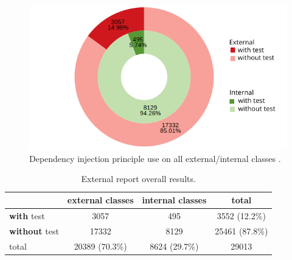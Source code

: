 \documentclass[11pt, a4paper, twocolumn]{article}
\begin{document}
\begin{figure}
    \centering
    \includegraphics[scale = 0.6]{overall_plot.png}
    \caption{\textsf{Dependency injection principle use on all external/internal classes .}}
    \label{fig:dip_withtest_overall}
\end{figure}

\begin{table}[] \centering
\begin{tabular}{|l|c|c|c|}
\hline
\multicolumn{1}{|c|}{} & \textbf{external} classes & \textbf{internal} classes & total \\ \hline
\textbf{with} test 		& 3057     			& 495      			& 3552 (12.2\%)  \\ \hline
\textbf{without} test	& 17332    			& 8129     			& 25461 (87.8\%) \\ \hline
total      		& 20389 (70.3\%)    & 8624 (29.7\%)    & 29013 \\ \hline
\end{tabular}
\caption{External report overall results.}
\label{table:total}
\end{table}
\end{document}
